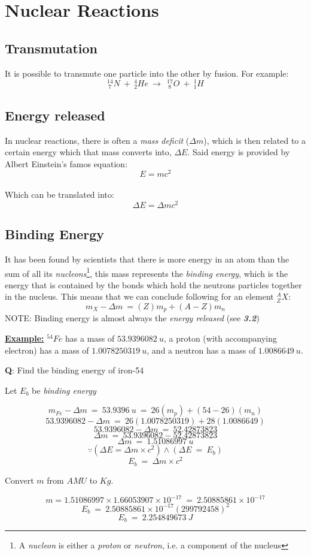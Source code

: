 \documentclass[12pt]{article}
\begin{document}
\newpage

\section{Nuclear Reactions}
\subsection{Transmutation}
It is possible to transmute one particle into the other by fusion. For example: $$^{14}_{\ 7}N \ + \ ^{4}_{2}He \ \rightarrow \ \ ^{17}_{\ 8}O \ + \ ^{1}_{1}H$$


\subsection{Energy released}

In nuclear reactions, there is often a \emph{mass deficit} ($\Delta m$), which is then related to a certain energy which that mass converts into, $\Delta E$. Said energy is provided by Albert Einstein's famos equation: $$E = mc^2$$ \\
Which can be translated into: $$\Delta E = \Delta mc^2$$

\newpage

\subsection{Binding Energy}
It has been found by scientists that there is more energy in an atom than the sum of all its \emph{nucleons}\footnote{A \emph{nucleon} is either a \emph{proton} or \emph{neutron}, i.e. a component of the nucleus}, this mass represents the \emph{binding energy}, which is the energy that is contained by the bonds which hold the neutrons particles together in the nucleus. This means that we can conclude following for an element $^{A}_{Z}X$: $$m_X - \Delta m \ = (Z)m_p + (A-Z)m_n$$
NOTE: Binding energy is almost always the \emph{energy released} (see \textbf{\emph{3.2}})
\begin{boxA}
	\textbf{\underline{Example:}}\bigbreak
	$^{54}Fe$ has a mass of $53.9396082 \ u$, a proton (with accompanying electron)
 has a mass of $1.0078250319 \ u$, and a neutron has a mass of $1.0086649 \ u$.

 \textbf{Q}: Find the binding energy of iron-54 

 Let $E_b$ be \emph{binding energy}

$$m_{Fe} - \Delta m \ = \ 53.9396 \ u \ = \ 26(m_p) + (54-26)(m_n)$$
$$53.9396082 - \Delta m \ = \ 26(1.0078250319) + 28(1.0086649)$$
$$53.9396082 - \Delta m \ = \ 52.42873823$$
$$\Delta m \ = \ 53.9396082 - 52.42873823$$
$$\Delta m \ = \ 1.51086997 \ u$$ \bigbreak
$$\because \left(\Delta E = \Delta m \times c^2 \right) \land \left(\Delta E \ = \ E_b \right)$$
$$E_b \ = \ \Delta m \times c^2$$
\begin{center}
Convert $m$ from $AMU$ to $Kg$. 
\end{center}
$$m = 1.51086997 \times 1.66053907 \times 10^{-17} \ = \ 2.50885861 \times 10^{-17}$$
$$E_b \ = \ 2.50885861 \times 10^{-17}(299 792 458)^2$$
$$E_b \ = \ 2.254849673 \ J$$
\end{boxA}
\end{document}
